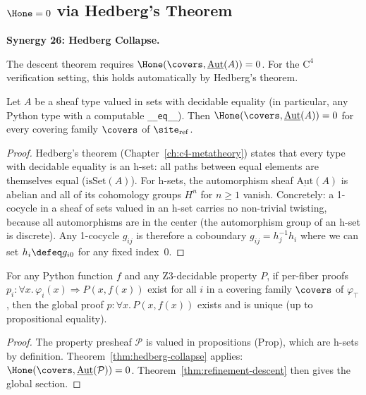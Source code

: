 \subsection{$\Hone = 0$ via Hedberg's Theorem}
\label{sec:hedberg-collapse}

\noindent\textbf{Synergy 26: Hedberg Collapse.}

The descent theorem requires $\Hone(\covers, \underline{\mathrm{Aut}}(A)) = 0$.
For the $\mathrm{C}^4$ verification setting, this holds automatically by
Hedberg's theorem.

\begin{theorem}
\label{thm:hedberg-collapse}
Let $A$ be a sheaf type valued in sets with decidable equality (in
particular, any Python type with a computable \texttt{\_\_eq\_\_}).  Then
$\Hone(\covers, \underline{\mathrm{Aut}}(A)) = 0$ for every covering
family $\covers$ of $\site_{\mathrm{ref}}$.
\end{theorem}

\begin{proof}
Hedberg's theorem (Chapter~\ref{ch:c4-metatheory}) states that every type
with decidable equality is an h-set: all paths between equal elements are
themselves equal ($\mathrm{isSet}(A)$).  For h-sets, the automorphism
sheaf $\underline{\mathrm{Aut}}(A)$ is abelian and all of its cohomology
groups $H^n$ for $n \ge 1$ vanish.  Concretely: a 1-cocycle in a sheaf
of sets valued in an h-set carries no non-trivial twisting, because all
automorphisms are in the center (the automorphism group of an h-set is
discrete).  Any 1-cocycle $g_{ij}$ is therefore a coboundary
$g_{ij} = h_j^{-1} h_i$ where we can set $h_i \defeq g_{i0}$ for any
fixed index~$0$.
\end{proof}

\begin{corollary}
\label{cor:automatic-gluing}
For any Python function $f$ and any Z3-decidable property $P$, if per-fiber
proofs $p_i : \forall x.\,\varphi_i(x) \Rightarrow P(x, f(x))$ exist for
all $i$ in a covering family $\covers$ of $\varphi_\top$, then the global
proof $p : \forall x.\, P(x, f(x))$ exists and is unique (up to propositional
equality).
\end{corollary}

\begin{proof}
The property presheaf $\mathcal{P}$ is valued in propositions (Prop), which
are h-sets by definition.  Theorem~\ref{thm:hedberg-collapse} applies:
$\Hone(\covers, \underline{\mathrm{Aut}}(\mathcal{P})) = 0$.
Theorem~\ref{thm:refinement-descent} then gives the global section.
\end{proof}

